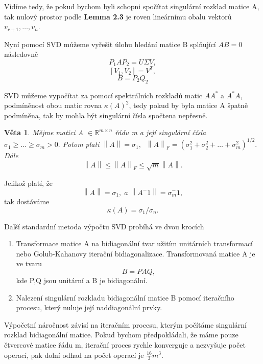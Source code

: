 \documentclass{article}
\theoremstyle{plain}
\newtheorem{veta}{Věta}[section]
\theoremstyle{definition}
\begin{document}
Vidíme tedy, že pokud bychom byli schopni spočítat singulární rozklad matice A, tak nulový prostor podle \textbf{Lemma 2.3} je roven lineárnímu obalu vektorů $v_{r+1},\hdots,v_n$.

Nyní pomocí SVD můžeme vyřešit úlohu hledání matice B splňující $AB=0$ následovně
$$P_1AP_2=U\Sigma V,$$
$$[V_1,V_2]=V^T,$$
$$B=P_2Q_2$$

\newpage

SVD můžeme vypočítat za pomocí spektrálních rozkladů matic $AA^*$ a $A^*A$, podmíněnost obou matic rovna $\kappa(A)^2$, tedy pokud by byla matice A špatně podmíněna, tak by mohla být singulární čísla spočtena nepřesně.

\begin{veta}
    Mějme matici A $\in \mathbb{R}^{m \times n}$ řádu m a její singulární čísla $\sigma_1\geq\hdots\geq\sigma_m>0.$
Potom platí $\left \lVert A \right \rVert = \sigma_1,\;\;
\left \lVert A \right \rVert _F = (\sigma_1^2+\sigma_2^2+\hdots+\sigma_m^2)^{1/2}.$
Dále
$$\left \lVert A \right \rVert \leq \left \lVert A \right \rVert _F \leq \sqrt{m} \left \lVert A \right \rVert.$$
\end{veta}
Jelikož platí, že $$\left \lVert A \right \rVert = \sigma_1,\;a\; \left \lVert A^-1 \right \rVert = \sigma_m^-1,$$
tak dostáváme
$$\kappa(A)=\sigma_1 / \sigma_n.$$

Další standardní metoda výpočtu SVD probíhá ve dvou krocích
\begin{enumerate}
    \item Transformace matice A na bidiagonální tvar užitím unitárních transformací nebo Golub-Kahanovy iterační bidiagonalizace. Transformovaná matice A je ve tvaru 
    $$B=PAQ,$$
    kde P,Q jsou unitární a B je bidiagonální.
    \item Nalezení singulární rozkladu bidiagonální matice B pomocí iteračního procesu, který nuluje její naddiagonální prvky.
\end{enumerate}

Výpočetní náročnost závisí na iteračním procesu, kterým počítáme singulární rozklad bidiagonální matice. Pokud bychom předpokládali, že máme pouze čtvercové matice řádu m, iterační proces rychle konverguje a nezvyšuje počet operací, pak dolní odhad na počet operací je $\frac{16}{3}  m^3$.

\newpage
\end{document}
